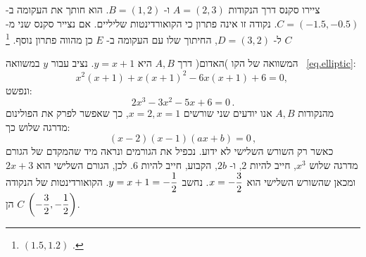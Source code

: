 %
%
%
%
%
%
%
%

ציירו סקנס דרך הנקודות
$A=(2,3)$
ו-%
$B=(1,2)$.
הוא חותך את העקומה ב-%
$C=(-1.5,-0.5)$.
נקודה זו אינה פתרון כי הקואורדינטות שליליים. אם נצייר סקנס שני מ-%
$C$
ל-%
$D=(3,2)$,
החיתוך שלו עם העקומה ב-%
$E$
כן מהווה פתרון נוסף.%
\footnote{$(1.5,1.2)$
.}

המשוואה של הקו )האדום( דרך 
$A,B$
היא
$y=x+1$. 
נציב עבור 
$y$
במשוואה%
~\ref{eq.elliptic}:
\[
x^2(x+1) + x(x+1)^2 -6x(x+1) +6 =0,\,
\]
ונפשט:
\[
2x^3 -3x^2 -5x +6 =0\,.
\]
מהנקודות
$A,B$
אנו יודעים שני שורשים
$x=2,x=1$,
כך שאפשר לפרק את הפולינום מדרגה שלוש כך:
\[
(x-2)(x-1)(ax+b)=0\,,
\]
כאשר רק השורש השלישי לא ידוע. נכפיל את הגורמים ונראה מיד שהמקדם של הגורם מדרגה שלוש
$x^3$,
חייב להיות
$2$,
ו-%
$2b$,
הקבוע, חייב להיות
$6$.
לכן, הגורם השלישי הוא
$2x+3$
ומכאן שהשורש השלישי הוא
$x=-\displaystyle\frac{3}{2}$.
נחשב
$y=x+1=-\displaystyle\frac{1}{2}$.
הקואורדינטות של הנקודה
$C$
הן
$\left(-\displaystyle\frac{3}{2},-\displaystyle\frac{1}{2}\right)$.

